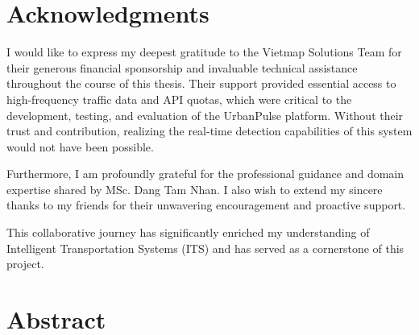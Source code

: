 \documentclass[12pt, twoside]{report}
\begin{document}
\begin{titlepage}
	\hspace{7cm}
	\makebox[7cm][l]{\underline{\hspace{7cm}}}
	\par \hspace{7cm}
	\par
	\vspace{0.75cm}
														
	\hspace{7cm}
	\par
	\thispagestyle{empty}
\end{titlepage}
\restoregeometry
	
\chapter*{Acknowledgments}
I would like to express my deepest gratitude to the Vietmap Solutions Team for their generous financial sponsorship and invaluable technical assistance throughout the course of this thesis. Their support provided essential access to high-frequency traffic data and API quotas, which were critical to the development, testing, and evaluation of the UrbanPulse platform. Without their trust and contribution, realizing the real-time detection capabilities of this system would not have been possible.

Furthermore, I am profoundly grateful for the professional guidance and domain expertise shared by MSc. Dang Tam Nhan. I also wish to extend my sincere thanks to my friends for their unwavering encouragement and proactive support.

This collaborative journey has significantly enriched my understanding of Intelligent Transportation Systems (ITS) and has served as a cornerstone of this project.
\thispagestyle{empty}

\tableofcontents
\listoftables
{}
\listoffigures
{}
\listofalgorithms
{}
\lstlistoflistings
{}

\chapter*{Abstract}
\end{document}
